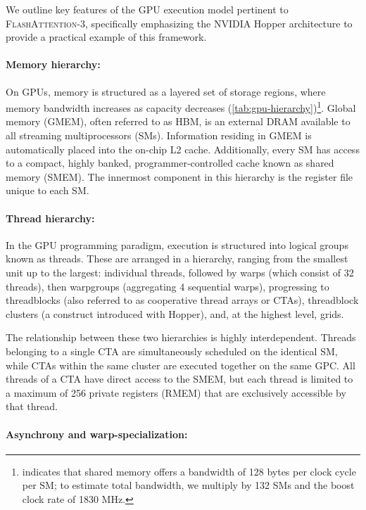 We outline key features of the GPU execution model pertinent to \textsc{FlashAttention-3}, specifically emphasizing the NVIDIA Hopper architecture to provide a practical example of this framework.

\paragraph{Memory hierarchy:} On GPUs, memory is structured as a layered set of storage regions, where memory bandwidth increases as capacity decreases (\cref{tab:gpu-hierarchy})\footnote{\citet{luo2024benchmarking} indicates that shared memory offers a bandwidth of 128 bytes per clock cycle per SM; to estimate total bandwidth, we multiply by 132 SMs and the boost clock rate of 1830 MHz.}. Global memory (GMEM), often referred to as HBM, is an external DRAM available to all streaming multiprocessors (SMs). Information residing in GMEM is automatically placed into the on-chip L2 cache. Additionally, every SM has access to a compact, highly banked, programmer-controlled cache known as shared memory (SMEM). The innermost component in this hierarchy is the register file unique to each SM.

\paragraph{Thread hierarchy:} In the GPU programming paradigm, execution is structured into logical groups known as threads. These are arranged in a hierarchy, ranging from the smallest unit up to the largest: individual threads, followed by warps (which consist of 32 threads), then warpgroups (aggregating 4 sequential warps), progressing to threadblocks (also referred to as cooperative thread arrays or CTAs), threadblock clusters (a construct introduced with Hopper), and, at the highest level, grids.

The relationship between these two hierarchies is highly interdependent. Threads belonging to a single CTA are simultaneously scheduled on the identical SM, while CTAs within the same cluster are executed together on the same GPC. All threads of a CTA have direct access to the SMEM, but each thread is limited to a maximum of 256 private registers (RMEM) that are exclusively accessible by that thread.

\paragraph{Asynchrony and warp-specialization:}


